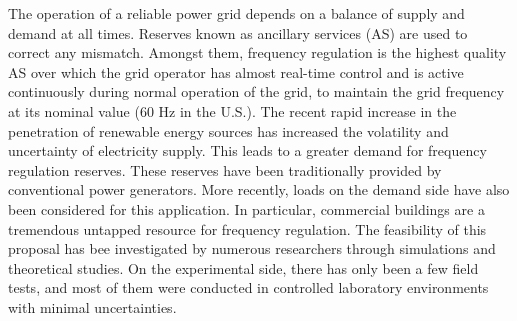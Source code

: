 \documentclass[../../thesis.tex]{subfiles}
\begin{document}
%
%


%
%


The operation of a reliable power grid depends on a balance of supply and demand at all times. 
Reserves known as ancillary services (AS) are used to correct any mismatch.
Amongst them, frequency regulation is the highest quality AS over which the grid operator has almost real-time control and is active continuously during normal operation of the grid, to maintain the grid frequency at its nominal value (60 Hz in the U.S.).
The recent rapid increase in the penetration of renewable energy sources has increased the volatility and uncertainty of electricity supply. This leads to a greater demand for frequency regulation reserves.
These reserves have been traditionally provided by conventional power generators. More recently, loads on the demand side have also been considered for this application.
In particular, commercial buildings are a tremendous untapped resource for frequency regulation. 
The feasibility of this proposal has bee investigated by numerous researchers through simulations and theoretical studies.
On the experimental side, there has only been a few field tests, and most of them were conducted in controlled laboratory environments with minimal uncertainties.
\end{document}
